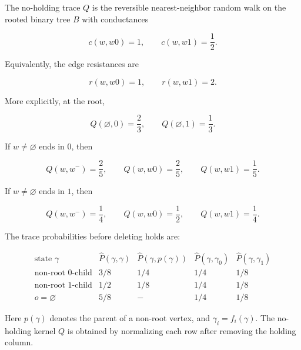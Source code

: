 \documentclass[10pt,a4paper]{amsart}
\begin{document}
\begin{proposition}\label{prop:trace-kernel}
The no-holding trace \(Q\) is the reversible
nearest-neighbor random walk on the rooted binary tree \(B\) with conductances

\[
c(w,w0)=1,
\qquad
c(w,w1)=\frac12 .
\]

Equivalently, the edge resistances are

\[
r(w,w0)=1,
\qquad
r(w,w1)=2 .
\]

More explicitly, at the root,

\[
Q(\varnothing,0)=\frac23,
\qquad
Q(\varnothing,1)=\frac13 .
\]

If \(w\ne\varnothing\) ends in \(0\), then

\[
Q(w,w^-)=\frac25,
\qquad
Q(w,w0)=\frac25,
\qquad
Q(w,w1)=\frac15 .
\]

If \(w\ne\varnothing\) ends in \(1\), then

\[
Q(w,w^-)=\frac14,
\qquad
Q(w,w0)=\frac12,
\qquad
Q(w,w1)=\frac14 .
\]

The trace probabilities before deleting holds are:

\[
\begin{array}{c|c|c|c|c}
\text{state } \gamma
& \widehat P(\gamma,\gamma)
& \widehat P(\gamma,p(\gamma))
& \widehat P(\gamma,\gamma_0)
& \widehat P(\gamma,\gamma_1)
\\ \hline
\text{non-root }0\text{-child}
& 3/8 & 1/4 & 1/4 & 1/8
\\
\text{non-root }1\text{-child}
& 1/2 & 1/8 & 1/4 & 1/8
\\
o=\varnothing
& 5/8 & - & 1/4 & 1/8
\end{array}
\]

Here \(p(\gamma)\) denotes the parent of a non-root vertex, and
\(\gamma_i=f_i(\gamma)\). The no-holding kernel \(Q\) is obtained by
normalizing each row after removing the holding column.

\end{proposition}
\end{document}
